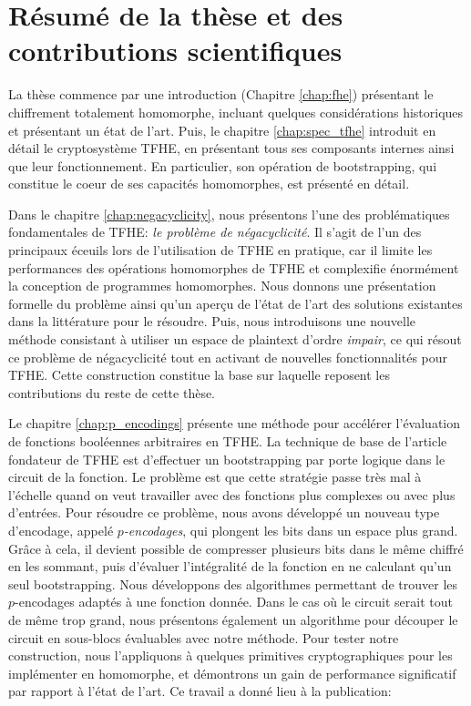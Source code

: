\section{Résumé de la thèse et des contributions scientifiques}

La thèse commence par une introduction (Chapitre \ref{chap:fhe}) présentant le chiffrement totalement homomorphe, incluant quelques considérations historiques et présentant un état de l’art. Puis, le chapitre \ref{chap:spec_tfhe} introduit en détail le cryptosystème TFHE, en présentant tous ses composants internes ainsi que leur fonctionnement. En particulier, son opération de bootstrapping, qui constitue le coeur de ses capacités homomorphes, est présenté en détail.


Dans le chapitre \ref{chap:negacyclicity}, nous présentons l'une des problématiques fondamentales de TFHE: \textit{le problème de négacyclicité}. Il s'agit de l’un des principaux éceuils lors de l'utilisation de TFHE en pratique,  car il limite les performances des opérations homomorphes de TFHE et complexifie énormément la conception de programmes homomorphes. Nous donnons une présentation formelle du problème ainsi qu’un aperçu de l’état de l’art des solutions existantes dans la littérature pour le résoudre. Puis, nous introduisons une nouvelle méthode consistant à utiliser un espace de plaintext d'ordre \textit{impair}, ce qui résout ce problème de négacyclicité tout en activant de nouvelles fonctionnalités pour TFHE. Cette construction constitue la base sur laquelle reposent les contributions du reste de cette thèse.


Le chapitre \ref{chap:p_encodings} présente une méthode pour accélérer l’évaluation de fonctions booléennes arbitraires en TFHE. La technique de base de l'article fondateur de TFHE est d'effectuer un bootstrapping par porte logique dans le circuit de la fonction. Le problème est que cette stratégie passe très mal à l'échelle quand on veut travailler avec des fonctions plus complexes ou avec plus d'entrées. Pour résoudre ce problème, nous avons développé un nouveau type d'encodage, appelé \textit{$p$-encodages}, qui plongent les bits dans un espace plus grand. Grâce à cela, il devient possible de compresser plusieurs bits dans le même chiffré en les sommant, puis d'évaluer l'intégralité de la fonction en ne calculant qu'un seul bootstrapping. Nous développons des algorithmes permettant de trouver les $p$-encodages adaptés à une fonction donnée. Dans le cas où le circuit serait tout de même trop grand, nous présentons également un algorithme pour découper le circuit en sous-blocs évaluables avec notre méthode. Pour tester notre construction, nous l'appliquons à quelques primitives cryptographiques pour les implémenter en homomorphe, et démontrons un gain de performance significatif par rapport à l’état de l’art.
Ce travail a donné lieu à la publication:

